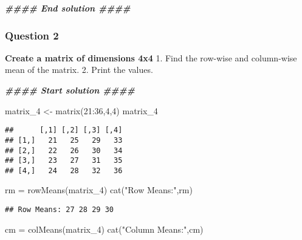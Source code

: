 \documentclass[
]{article}
\newenvironment{Shaded}{\begin{snugshade}}{\end{snugshade}}
\newcommand{\DecValTok}[1]{\textcolor[rgb]{0.00,0.00,0.81}{#1}}
\newcommand{\DocumentationTok}[1]{\textcolor[rgb]{0.56,0.35,0.01}{\textbf{\textit{#1}}}}
\newcommand{\FunctionTok}[1]{\textcolor[rgb]{0.00,0.00,0.00}{#1}}
\newcommand{\NormalTok}[1]{#1}
\newcommand{\OtherTok}[1]{\textcolor[rgb]{0.56,0.35,0.01}{#1}}
\newcommand{\SpecialCharTok}[1]{\textcolor[rgb]{0.00,0.00,0.00}{#1}}
\newcommand{\StringTok}[1]{\textcolor[rgb]{0.31,0.60,0.02}{#1}}
\begin{document}
\begin{Shaded}
\begin{Highlighting}[]
\DocumentationTok{\#\#\#\# End solution \#\#\#\#}
\end{Highlighting}
\end{Shaded}

\hypertarget{question-2-4}{%
\subsubsection{Question 2}\label{question-2-4}}

\textbf{Create a matrix of dimensions 4x4} 1. Find the row-wise and
column-wise mean of the matrix. 2. Print the values.

\begin{Shaded}
\begin{Highlighting}[]
\DocumentationTok{\#\#\#\# Start solution \#\#\#\#}
\end{Highlighting}
\end{Shaded}

\begin{Shaded}
\begin{Highlighting}[]
\NormalTok{matrix\_4 }\OtherTok{\textless{}{-}} \FunctionTok{matrix}\NormalTok{(}\DecValTok{21}\SpecialCharTok{:}\DecValTok{36}\NormalTok{,}\DecValTok{4}\NormalTok{,}\DecValTok{4}\NormalTok{)}
\NormalTok{matrix\_4}
\end{Highlighting}
\end{Shaded}

\begin{verbatim}
##      [,1] [,2] [,3] [,4]
## [1,]   21   25   29   33
## [2,]   22   26   30   34
## [3,]   23   27   31   35
## [4,]   24   28   32   36
\end{verbatim}

\begin{Shaded}
\begin{Highlighting}[]
\NormalTok{rm }\OtherTok{=} \FunctionTok{rowMeans}\NormalTok{(matrix\_4)}
\FunctionTok{cat}\NormalTok{(}\StringTok{"Row Means:"}\NormalTok{,rm)}
\end{Highlighting}
\end{Shaded}

\begin{verbatim}
## Row Means: 27 28 29 30
\end{verbatim}

\begin{Shaded}
\begin{Highlighting}[]
\NormalTok{cm }\OtherTok{=} \FunctionTok{colMeans}\NormalTok{(matrix\_4)}
\FunctionTok{cat}\NormalTok{(}\StringTok{"Column Means:"}\NormalTok{,cm)}
\end{Highlighting}
\end{Shaded}
\end{document}
